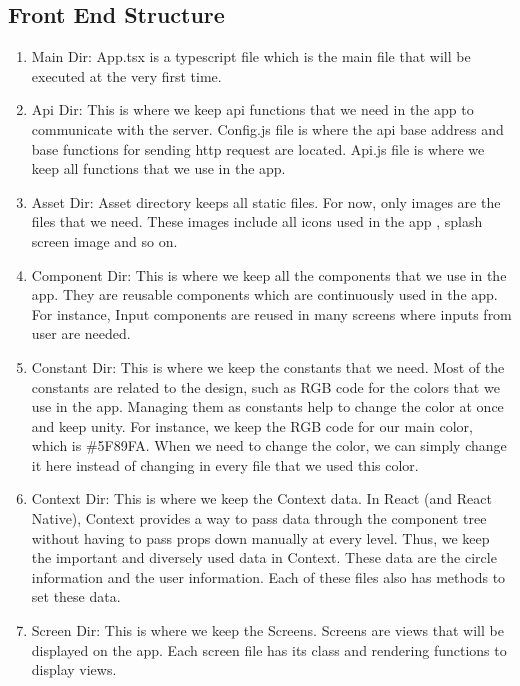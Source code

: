 \documentclass[conference]{IEEEtran}
\begin{document}
\subsection{Front End Structure}
\begin{enumerate}
    \item Main Dir: App.tsx is a typescript file which is the main file that will be executed at the very first time.
    \item Api Dir: This is where we keep api functions that we need in the app to communicate with the server. Config.js file is where the api base address and base functions for sending http request are located. Api.js file is where we keep all functions that we use in the app.
    \item Asset Dir: Asset directory keeps all static files. For now, only images are the files that we need. These images include all icons used in the app , splash screen image and so on.
    \item Component Dir: This is where we keep all the components that we use in the app. They are reusable components which are continuously used in the app. For instance, Input components are reused in many screens where inputs from user are needed.
    \item Constant Dir: This is where we keep the constants that we need. Most of the constants are related to the design, such as RGB code for the colors that we use in the app. Managing them as constants help to change the color at once and keep unity. For instance, we keep the RGB code for our main color, which is \#5F89FA. When we need to change the color, we can simply change it here instead of changing in every file that we used this color.
    \item Context Dir: This is where we keep the Context data. In React (and React Native), Context provides a way to pass data through the component tree without having to pass props down manually at every level. Thus, we keep the important and diversely used data in Context. These data are the circle information and the user information. Each of these files also has methods to set these data.
    \item Screen Dir: This is where we keep the Screens. Screens are views that will be displayed on the app. Each screen file has its class and rendering functions to display views.
\end{enumerate}
\end{document}
